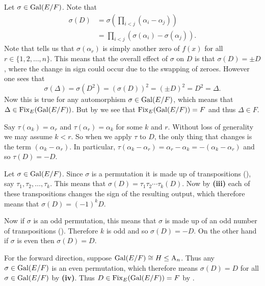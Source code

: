 \begin{questions}
\begin{partquestions}{\roman*}
        \item Let $\sigma \in \mathrm{Gal}(E/F)$. Note that
        \begin{align*}
            \sigma(D) &= \sigma\left(\prod_{i<j}(\alpha_i - \alpha_j)\right)\\
            &= \prod_{i<j}(\sigma(\alpha_i) - \sigma(\alpha_j)).
        \end{align*}
        Note that  tells us that $\sigma(\alpha_r)$ is simply another zero of $f(x)$ for all $r \in \{1, 2, \dots, n\}$. This means that the overall effect of $\sigma$ on $D$ is that $\sigma(D) = \pm D$, where the change in sign could occur due to the swapping of zeroes. However one sees that
        \[
            \sigma(\Delta) = \sigma(D^2) = (\sigma(D))^2 = (\pm D)^2 = D^2 = \Delta.
        \]
        Now this is true for any automorphism $\sigma \in \mathrm{Gal}(E/F)$, which means that $\Delta \in \mathrm{Fix}_{E}(\mathrm{Gal}(E/F))$. But by  we see that $\mathrm{Fix}_{E}(\mathrm{Gal}(E/F)) = F$ and thus $\Delta \in F$.

        \item Say $\tau(\alpha_k) = \alpha_r$ and $\tau(\alpha_r) = \alpha_k$ for some $k$ and $r$. Without loss of generality we may assume $k < r$. So when we apply $\tau$ to $D$, the only thing that changes is the term $(\alpha_k - \alpha_r)$. In particular, $\tau(\alpha_k - \alpha_r) = \alpha_r - \alpha_k = -(\alpha_k - \alpha_r)$ and so $\tau(D) = -D$.

        \item Let $\sigma \in \mathrm{Gal}(E/F)$. Since $\sigma$ is a permutation it is made up of transpositions (), say $\tau_1, \tau_2, \dots, \tau_k$. This means that $\sigma(D) = \tau_1\tau_2\cdots\tau_k(D)$. Now by \textbf{(iii)} each of these transpositions changes the sign of the resulting output, which therefore means that $\sigma(D) = (-1)^kD$.

        Now if $\sigma$ is an odd permutation, this means that $\sigma$ is made up of an odd number of transpositions (). Therefore $k$ is odd and so $\sigma(D) = -D$. On the other hand if $\sigma$ is even then $\sigma(D) = D$.

        \item For the forward direction, suppose $\mathrm{Gal}(E/F) \cong H \leq \mathrm{A}_{n}$. Thus any $\sigma \in \mathrm{Gal}(E/F)$ is an even permutation, which therefore means $\sigma(D) = D$ for all $\sigma \in \mathrm{Gal}(E/F)$ by \textbf{(iv)}. Thus $D \in \mathrm{Fix}_{E}(\mathrm{Gal}(E/F)) = F$ by .


\end{partquestions}
\end{questions}
